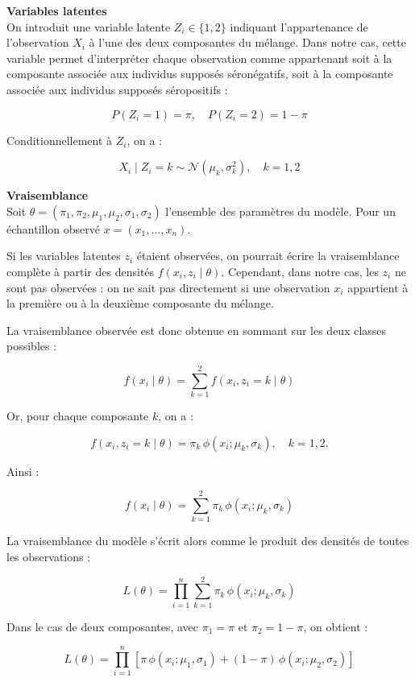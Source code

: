 \documentclass[a4paper]{article}
\begin{document}
\textbf{Variables latentes} \\

On introduit une variable latente $Z_i \in \{1,2\}$ indiquant l’appartenance de l’observation $X_i$ à l’une des deux composantes du mélange. Dans notre cas, cette variable permet d’interpréter chaque observation comme appartenant soit à la composante associée aux individus supposés séronégatifs, soit à la composante associée aux individus supposés séropositifs :

\[
P(Z_i = 1) = \pi, \quad P(Z_i = 2) = 1 - \pi
\]

Conditionnellement à $Z_i$, on a :

\[
X_i \mid Z_i = k \sim \mathcal{N}(\mu_k, \sigma_k^2), \quad k = 1,2
\]

\textbf{Vraisemblance} \\


Soit \(\theta = (\pi_1,\pi_2,\mu_1,\mu_2,\sigma_1,\sigma_2)\) l'ensemble des paramètres du modèle. Pour un échantillon observé \(x = (x_1,\ldots,x_n)\).

Si les variables latentes \(z_i\) étaient observées, on pourrait écrire la vraisemblance complète à partir des densités \(f(x_i,z_i \mid \theta)\). Cependant, dans notre cas, les \(z_i\) ne sont pas observées : on ne sait pas directement si une observation \(x_i\) appartient à la première ou à la deuxième composante du mélange.

La vraisemblance observée est donc obtenue en sommant sur les deux classes possibles :

\[
f(x_i \mid \theta)
=
\sum_{k=1}^{2} f(x_i,z_i=k \mid \theta)
\]

Or, pour chaque composante \(k\), on a :

\[
f(x_i,z_i=k \mid \theta)
=
\pi_k \, \phi(x_i;\mu_k,\sigma_k),
\quad k=1,2.
\]

Ainsi :

\[
f(x_i \mid \theta)
=
\sum_{k=1}^{2}
\pi_k \, \phi(x_i;\mu_k,\sigma_k)
\]

La vraisemblance du modèle s'écrit alors comme le produit des densités de toutes les observations :

\[
L(\theta)
=
\prod_{i=1}^{n}
\sum_{k=1}^{2}
\pi_k \, \phi(x_i;\mu_k,\sigma_k)
\]

Dans le cas de deux composantes, avec \(\pi_1=\pi\) et \(\pi_2=1-\pi\), on obtient :

\[
L(\theta)
=
\prod_{i=1}^{n}
\left[
\pi \, \phi(x_i;\mu_1,\sigma_1)
+
(1-\pi) \, \phi(x_i;\mu_2,\sigma_2)
\right]
\]
\end{document}
